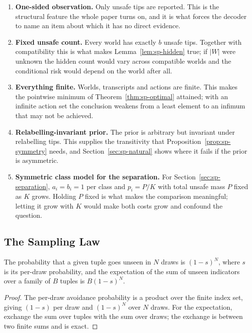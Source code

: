 \begin{enumerate}
\item[1)] \textbf{One-sided observation.} Only unsafe tips are reported. This is the
structural feature the whole paper turns on, and it is what forces the decoder to name an item
about which it has no direct evidence.

\item[2)] \textbf{Fixed unsafe count.} Every world has exactly $b$ unsafe tips. Together with
compatibility this is what makes Lemma~\ref{lem:sp-hidden} true; if $|W|$ were unknown the hidden
count would vary across compatible worlds and the conditional risk would depend on the world
after all.

\item[3)] \textbf{Everything finite.} Worlds, transcripts and actions are finite. This makes
the pointwise minimum of Theorem~\ref{thm:sp-optimal} attained; with an infinite action set the
conclusion weakens from a least element to an infimum that may not be achieved.

\item[4)] \textbf{Relabelling-invariant prior.} The prior is arbitrary but invariant under
relabelling tips. This supplies the transitivity that Proposition~\ref{prop:sp-symmetry} needs,
and Section~\ref{sec:sp-natural} shows where it fails if the prior is asymmetric.

\item[5)] \textbf{Symmetric class model for the separation.} For
Section~\ref{sec:sp-separation}, $a_{i}=b_{i}=1$ per class and $p_{i}=P/K$ with total unsafe mass
$P$ fixed as $K$ grows. Holding $P$ fixed is what makes the comparison meaningful; letting it
grow with $K$ would make both costs grow and confound the question.
\end{enumerate}

\subsection{The Sampling Law}
\label{sec:sp-sampling}

\begin{theorem}
\label{thm:sp-sampling}
The probability that a given tuple goes unseen in $N$ draws is $(1-s)^{N}$, where $s$ is its
per-draw probability, and the expectation of the sum of unseen indicators over a family of $B$
tuples is $B(1-s)^{N}$.
\end{theorem}

\begin{proof}
The per-draw avoidance probability is a product over the finite index set, giving $(1-s)$ per
draw and $(1-s)^{N}$ over $N$ draws. For the expectation, exchange the sum over tuples with
the sum over draws; the exchange is between two finite sums and is exact.
\end{proof}

